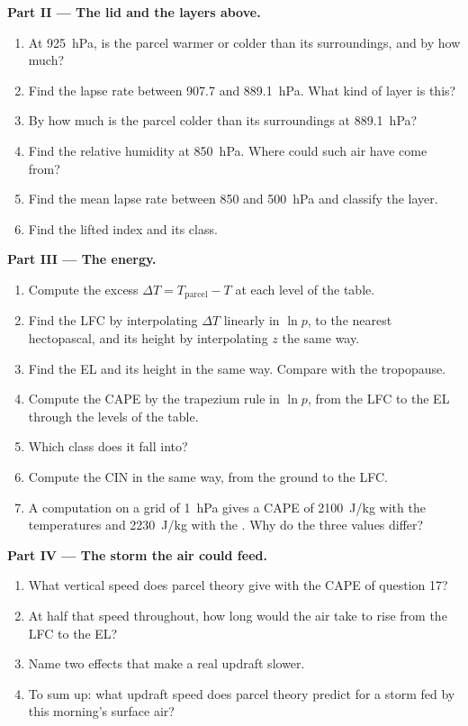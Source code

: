 \begin{problem}
\medskip\noindent\textbf{Part II --- The lid and the layers above.}
\begin{enumerate}[resume]
  \item At \qty{925}{hPa}, is the parcel warmer or colder than its surroundings, and by how much?
  \item Find the lapse rate between 907.7 and \qty{889.1}{hPa}. What kind of layer is this?
  \item By how much is the parcel colder than its surroundings at \qty{889.1}{hPa}?
  \item Find the relative humidity at \qty{850}{hPa}. Where could such air have come from?
  \item Find the mean lapse rate between 850 and \qty{500}{hPa} and classify the layer.
  \item Find the lifted index and its class.
\end{enumerate}

\medskip\noindent\textbf{Part III --- The energy.}
\begin{enumerate}[resume]
  \item Compute the excess $\Delta T = T_{\text{parcel}} - T$ at each level of the table.
  \item Find the LFC by interpolating $\Delta T$ linearly in $\ln p$, to the nearest hectopascal,
        and its height by interpolating $z$ the same way.
  \item Find the EL and its height in the same way. Compare with the tropopause.
  \item Compute the CAPE by the trapezium rule in $\ln p$, from the LFC to the EL through the
        levels of the table.
  \item Which class does it fall into?
  \item Compute the CIN in the same way, from the ground to the LFC.
  \item A computation on a grid of \qty{1}{hPa} gives a CAPE of \qty{2100}{J/kg} with the
        temperatures and \qty{2230}{J/kg} with the . Why do the three values
        differ?
\end{enumerate}

\medskip\noindent\textbf{Part IV --- The storm the air could feed.}
\begin{enumerate}[resume]
  \item What vertical speed does parcel theory give with the CAPE of question 17?
  \item At half that speed throughout, how long would the air take to rise from the LFC to the EL?
  \item Name two effects that make a real updraft slower.
  \item To sum up: what updraft speed does parcel theory predict for a storm fed by this
        morning's surface air?
\end{enumerate}
\end{problem}
